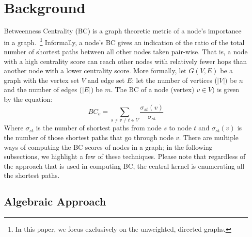 \section{Background}
\label{sec:background}
Betweenness Centrality (BC) is a graph theoretic metric of a node's importance
in a graph.~\footnote{In this paper, we focus exclusively on the unweighted,
directed graphs.}
%
Informally, a node's BC gives an indication of the ratio of the total number 
of shortest paths between all other nodes taken pair-wise.
%
That is, a node with a high centrality score can reach other nodes with 
relatively fewer hops than another node with a lower centrality score.
%
More formally, let $G(V,E)$ be a graph with the vertex set $V$ and edge set
$E$; let the number of vertices ($\lvert{}V\rvert{})$ be $n$ and the number of 
edges ($\lvert{}E\rvert{}$) be $m$.
%
The BC of a node (vertex) $v\in{V})$ is given by the equation:
%
\begin{equation}
BC_{v} = \sum_{s\ne{}v\ne{}t\in{}V}{\frac{\sigma{}_{st}(v)}{\sigma{}_{st}}}
\label{eq:bc}
\end{equation}
%
Where $\sigma{}_{st}$ is the number of shortest paths from node $s$ to node $t$ 
and $\sigma{}_{st}(v)$ is the number of those shortest paths that go through 
node $v$.
There are multiple ways of computing the BC scores of nodes in a graph; in the
following subsections, we highlight a few of these techniques.
%
Please note that regardless of the approach that is used in computing BC, the 
central kernel is enumerating all the shortest paths.

\subsection{Algebraic Approach}
\label{subsec:algebraic}

